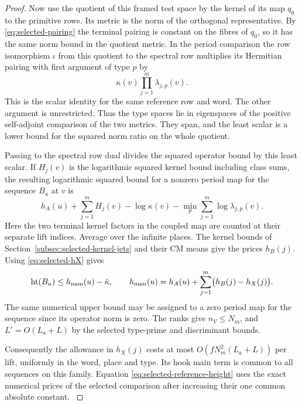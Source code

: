 \begin{proof}
Now use the quotient of this framed test space by the
kernel of its map \(q_0\) to the primitive rows. Its
metric is the norm of the orthogonal representative.
By \eqref{eq:selected-pairing} the terminal pairing
is constant on the fibres of \(q_0\), so it has the
same norm bound in the quotient metric. In the period
comparison the row isomorphism \(\iota\) from this
quotient to the spectral row multiplies its Hermitian
pairing with first argument of type \(p\) by
\[
             \kappa(v)\prod_{j=1}^m\lambda_{j,p}(v).
\]
This is the scalar identity for the same reference
row and word. The other argument is unrestricted.
Thus the type spaces lie in eigenspaces of the
positive self-adjoint comparison of the two metrics.
They span, and the least scalar is a lower bound for
the squared norm ratio on the whole quotient.

Passing to the spectral row dual divides the squared
operator bound by this least scalar. If \(H_j(v)\)
is the logarithmic squared kernel bound including
class sums, the resulting logarithmic squared bound
for a nonzero period map for the sequence \(B_u\) at \(v\) is
\[
 h_A(u)+\sum_{j=1}^m H_j(v)-\log\kappa(v)
                       -\min_p\sum_{j=1}^m\log\lambda_{j,p}(v).
\]
Here the two terminal kernel factors in the coupled
map are counted at their separate lift indices.
Average over the infinite places. The kernel bounds
of Section~\ref{subsec:selected-kernel-jets} and their
CM means give the prices \(h_B(j)\). Using
\eqref{eq:selected-hX} gives
\begin{equation}\label{eq:selected-reference-height}
 \operatorname{ht}(B_u)
    \le h_{\rm num}(u)-\bar\kappa,\qquad
 h_{\rm num}(u)=h_A(u)+\sum_{j=1}^m\bigl(h_B(j)-h_X(j)\bigr).
\end{equation}
The same numerical upper bound may be assigned to a zero period map for the sequence since its operator norm is zero.
The ranks give \(n_V\le N_m\), and \(L'=O(L_a+L)\)
by the selected type-prime and discriminant bounds.

Consequently the allowance in \(h_X(j)\) costs at
most \(O(fN_m^2(L_a+L))\) per lift, uniformly in the
word, place and type. Its hook main term is common
to all sequences on this family. Equation
\eqref{eq:selected-reference-height} uses the exact
numerical prices of the selected comparison after
increasing their one common absolute constant.
\label{cor:selected-lift-scalar-8}
\end{proof}

